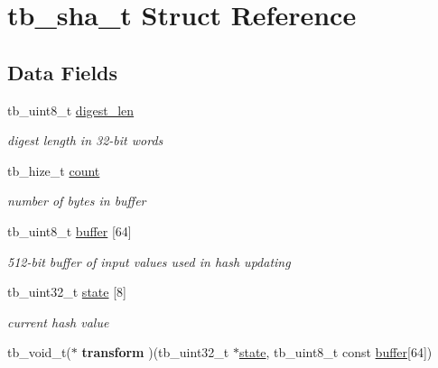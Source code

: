 \hypertarget{structtb__sha__t}{\section{tb\-\_\-sha\-\_\-t Struct Reference}
\label{structtb__sha__t}
}
\subsection*{Data Fields}
\begin{DoxyCompactItemize}
\item 
\hypertarget{structtb__sha__t_a082b094f2c70a3776135167be35e7be6}{tb\-\_\-uint8\-\_\-t \hyperlink{structtb__sha__t_a082b094f2c70a3776135167be35e7be6}{digest\-\_\-len}}\label{structtb__sha__t_a082b094f2c70a3776135167be35e7be6}

\begin{DoxyCompactList}\small\item\em digest length in 32-\/bit words \end{DoxyCompactList}\item 
\hypertarget{structtb__sha__t_ad56881abd9741bfbb9532da7fc0f826b}{tb\-\_\-hize\-\_\-t \hyperlink{structtb__sha__t_ad56881abd9741bfbb9532da7fc0f826b}{count}}\label{structtb__sha__t_ad56881abd9741bfbb9532da7fc0f826b}

\begin{DoxyCompactList}\small\item\em number of bytes in buffer \end{DoxyCompactList}\item 
\hypertarget{structtb__sha__t_a37963863cabfb27fbbe60c0326a0d89d}{tb\-\_\-uint8\-\_\-t \hyperlink{structtb__sha__t_a37963863cabfb27fbbe60c0326a0d89d}{buffer} \mbox{[}64\mbox{]}}\label{structtb__sha__t_a37963863cabfb27fbbe60c0326a0d89d}

\begin{DoxyCompactList}\small\item\em 512-\/bit buffer of input values used in hash updating \end{DoxyCompactList}\item 
\hypertarget{structtb__sha__t_a0af72045c3e7a0d58afe56c93693209b}{tb\-\_\-uint32\-\_\-t \hyperlink{structtb__sha__t_a0af72045c3e7a0d58afe56c93693209b}{state} \mbox{[}8\mbox{]}}\label{structtb__sha__t_a0af72045c3e7a0d58afe56c93693209b}

\begin{DoxyCompactList}\small\item\em current hash value \end{DoxyCompactList}\item 
\hypertarget{structtb__sha__t_aeb27f495b4da5abc68ab9e8861b04fa5}{tb\-\_\-void\-\_\-t($\ast$ {\bfseries transform} )(tb\-\_\-uint32\-\_\-t $\ast$\hyperlink{structtb__sha__t_a0af72045c3e7a0d58afe56c93693209b}{state}, tb\-\_\-uint8\-\_\-t const \hyperlink{structtb__sha__t_a37963863cabfb27fbbe60c0326a0d89d}{buffer}\mbox{[}64\mbox{]})}\label{structtb__sha__t_aeb27f495b4da5abc68ab9e8861b04fa5}

\end{DoxyCompactItemize}


